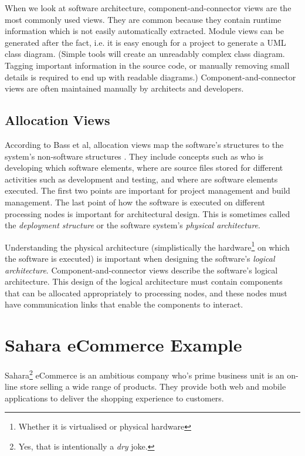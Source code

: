 When we look at software architecture, component-and-connector views are the most commonly used views.
They are common because they contain runtime information which is not easily automatically extracted.
Module views can be generated after the fact, i.e. it is easy enough for a project to generate a UML class diagram.
(Simple tools will create an unreadably complex class diagram.
Tagging important information in the source code, or manually removing small details is required to end up with readable diagrams.)
Component-and-connector views are often maintained manually by architects and developers.

\subsection{Allocation Views}
According to Bass et al, allocation views map the software's structures to the system's non-software structures \cite{bass2021software}.
They include concepts such as who is developing which software elements,
where are source files stored for different activities such as development and testing,
and where are software elements executed.
The first two points are important for project management and build management.
The last point of how the software is executed on different processing nodes is important for architectural design.
This is sometimes called the \emph{deployment structure} or the software system's \emph{physical architecture}.

Understanding the physical architecture (simplistically the hardware\footnote{Whether it is virtualised or physical hardware}
on which the software is executed) is important when designing the software's \emph{logical architecture}.
Component-and-connector views describe the software's logical architecture.
This design of the logical architecture must contain components that can be allocated appropriately to processing nodes,
and these nodes must have communication links that enable the components to interact.

\section{Sahara eCommerce Example}\label{sec:storeExample}
Sahara\footnote{Yes, that is intentionally a \textit{dry} joke.} eCommerce is an ambitious company who's prime business unit is an on-line store selling a wide range of products.
They provide both web and mobile applications to deliver the shopping experience to customers.

